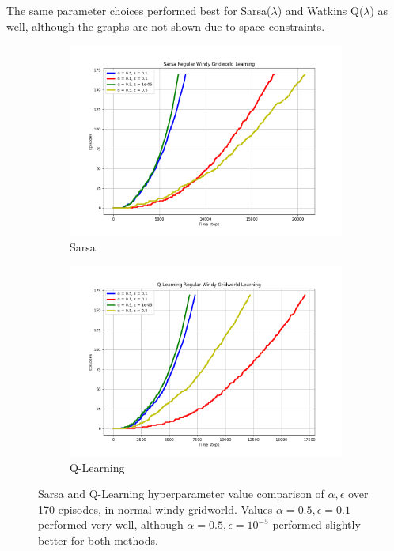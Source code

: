 \documentclass{article}
\begin{document}
The same parameter choices performed best for Sarsa($\lambda$) and Watkins Q($\lambda$) as well, although the graphs are not shown due to space constraints. 

\begin{figure}[h!]
  \centering
  \begin{subfigure}{0.45\textwidth} 
    \includegraphics[width=\textwidth]{sarsa_regular.png}
    \caption{Sarsa}
  \end{subfigure}
  \hspace{0.05\textwidth}  
  \begin{subfigure}{0.45\textwidth}  
    \includegraphics[width=\textwidth]{q_regular.png}
    \caption{Q-Learning}
  \end{subfigure}
  \caption{Sarsa and Q-Learning hyperparameter value comparison of $\alpha, \epsilon$ over 170 episodes, in normal windy gridworld. Values $\alpha = 0.5, \epsilon = 0.1$ performed very well, although $\alpha = 0.5, \epsilon = 10^{-5}$ performed slightly better for both methods.}
  \label{fig:hyperparam}
\end{figure}
\end{document}
